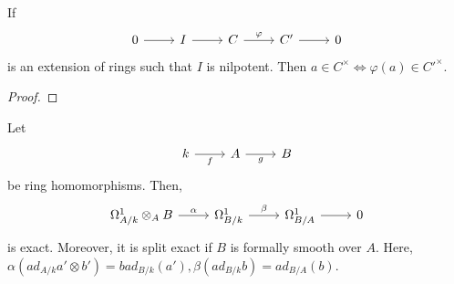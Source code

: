 \documentclass[oneside, 12pt, ]{scrbook}
\theoremstyle{theorem}
\begin{document}
\begin{lemma}
If \[\begin{tikzcd}
	0 & I & C & C' & 0
	\arrow[from=1-1, to=1-2]
	\arrow[from=1-2, to=1-3]
	\arrow["\varphi", from=1-3, to=1-4]
	\arrow[from=1-4, to=1-5]
\end{tikzcd}\] is an extension of rings such that $I$ is nilpotent. Then $a\in C^{\times} \Leftrightarrow \varphi(a) \in C'^{\times}$.
\end{lemma}

\begin{proof}

\end{proof}

\begin{theorem}
Let \[\begin{tikzcd}
	k & A & B
	\arrow["f"', from=1-1, to=1-2]
	\arrow["g"', from=1-2, to=1-3]
\end{tikzcd}\] be ring homomorphisms. Then, \[\begin{tikzcd}
	{\Omega_{A/k}^{1} \otimes_{A} B } & {\Omega_{B/k}^{1}} & {\Omega_{B/A}^{1}} & 0
	\arrow["\alpha", from=1-1, to=1-2]
	\arrow["\beta", from=1-2, to=1-3]
	\arrow[from=1-3, to=1-4]
\end{tikzcd}\] is exact. Moreover, it is split exact if $B$ is formally smooth over $A$. Here, $\alpha(ad_{A/k}a' \otimes b') = bad_{B/k}(a'), \beta(ad_{B/k}b) = ad_{B/A}(b)$.
\end{theorem}
\end{document}
